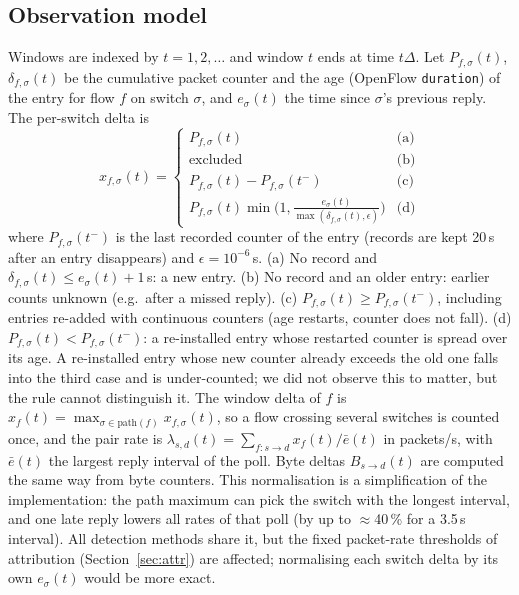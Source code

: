 \documentclass[conference]{IEEEtran}
\begin{document}
\subsection{Observation model}
Windows are indexed by $t=1,2,\dots$ and window $t$ ends at time $t\Delta$. Let $P_{f,\sigma}(t)$, $\delta_{f,\sigma}(t)$ be the cumulative packet counter and the age (OpenFlow \texttt{duration}) of the entry for flow $f$ on switch $\sigma$, and $e_\sigma(t)$ the time since $\sigma$'s previous reply. The per-switch delta is
\begin{equation}
x_{f,\sigma}(t)=\begin{cases}
P_{f,\sigma}(t) & \text{(a)}\\
\text{excluded} & \text{(b)}\\
P_{f,\sigma}(t)-P_{f,\sigma}(t^-) & \text{(c)}\\
P_{f,\sigma}(t)\min\!\big(1,\tfrac{e_\sigma(t)}{\max(\delta_{f,\sigma}(t),\epsilon)}\big) & \text{(d)}
\end{cases}\label{eq:delta}
\end{equation}
where $P_{f,\sigma}(t^-)$ is the last recorded counter of the entry (records are kept 20\,s after an entry disappears) and $\epsilon=10^{-6}$\,s. (a) No record and $\delta_{f,\sigma}(t)\le e_\sigma(t)+1$\,s: a new entry. (b) No record and an older entry: earlier counts unknown (e.g.\ after a missed reply). (c) $P_{f,\sigma}(t)\ge P_{f,\sigma}(t^-)$, including entries re-added with continuous counters (age restarts, counter does not fall). (d) $P_{f,\sigma}(t)<P_{f,\sigma}(t^-)$: a re-installed entry whose restarted counter is spread over its age. A re-installed entry whose new counter already exceeds the old one falls into the third case and is under-counted; we did not observe this to matter, but the rule cannot distinguish it. The window delta of $f$ is $x_f(t)=\max_{\sigma\in\text{path}(f)}x_{f,\sigma}(t)$, so a flow crossing several switches is counted once, and the pair rate is $\lambda_{s,d}(t)=\sum_{f:s\to d}x_f(t)/\bar e(t)$ in packets/s, with $\bar e(t)$ the largest reply interval of the poll. Byte deltas $B_{s\to d}(t)$ are computed the same way from byte counters. This normalisation is a simplification of the implementation: the path maximum can pick the switch with the longest interval, and one late reply lowers all rates of that poll (by up to $\approx$40\,\% for a 3.5\,s interval). All detection methods share it, but the fixed packet-rate thresholds of attribution (Section~\ref{sec:attr}) are affected; normalising each switch delta by its own $e_\sigma(t)$ would be more exact.
\end{document}
